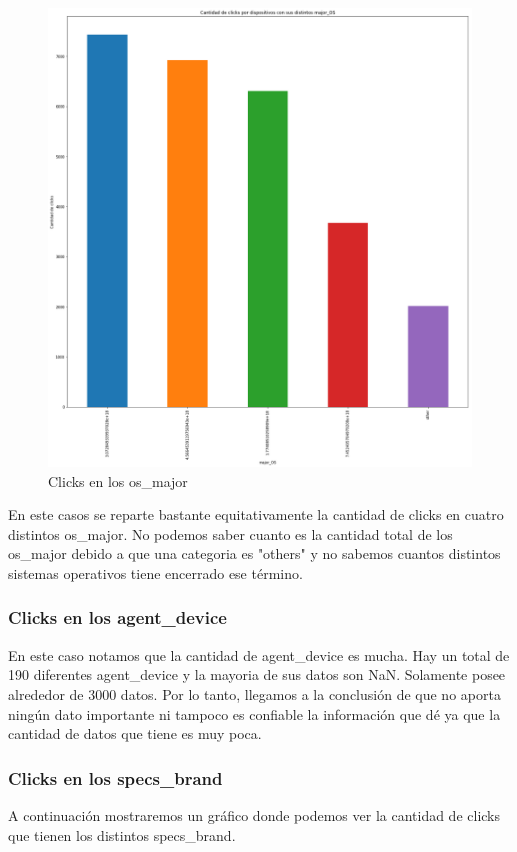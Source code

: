 \documentclass[a4paper, 12pt]{article}
\newcommand\tab[1][1cm]{\hspace*{#1}}
\begin{document}
		\FloatBarrier
		\begin{figure}[h]
			\centering
			\includegraphics[width=\textwidth]{images/clicks/clicks_major_OS.png}
			\caption{Clicks en los os_major}
		\end{figure}
		\FloatBarrier

		\tab En este casos se reparte bastante equitativamente la cantidad de clicks en cuatro distintos os_major. No podemos saber cuanto es la cantidad total de los os_major debido a que una categoria es "others" y no sabemos cuantos distintos sistemas operativos tiene encerrado ese término.

	\subsubsection{Clicks en los agent_device}
		\tab En este caso notamos que la cantidad de agent_device es mucha. Hay un total de 190 diferentes agent_device y la mayoria de sus datos son NaN. Solamente posee alrededor de 3000 datos. Por lo tanto, llegamos a la conclusión de que no aporta ningún dato importante ni tampoco es confiable la información que dé ya que la cantidad de datos que tiene es muy poca.

	\subsubsection{Clicks en los specs_brand}
		\tab A continuación mostraremos un gráfico donde podemos ver la cantidad de clicks que tienen los distintos specs_brand.
\end{document}
